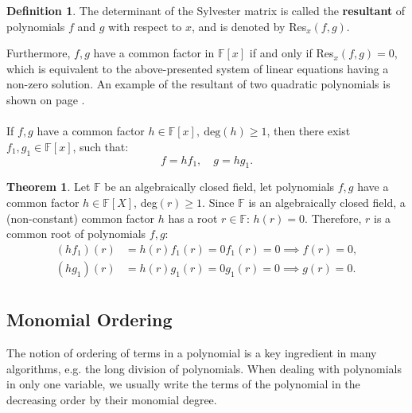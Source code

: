 \documentclass[thesis=M,english]{FITthesis}[2012/10/20]
\theoremstyle{remark}
\theoremstyle{definition}
\newtheorem{DF}{Definition}[section]
\newtheorem{theorem}{Theorem}[section]
\begin{document}
\begin{DF}
\noindent The determinant of the Sylvester matrix is called the \textbf{resultant} of polynomials $f$ and $g$ with respect to $x$, and is denoted by Res$_{x}(f,g)$.
\end{DF}
\noindent Furthermore, $f,g$ have a common factor in $\mathbb{F}[x]$ if and only if Res$_x(f,g) = 0$, which is equivalent to the above-presented system of linear equations having a non-zero solution. An example of the resultant of two quadratic polynomials is shown on page \pageref{resExample}. 
\\ \\
\noindent If $f,g$ have a common factor $h \in \mathbb{F}[x],\ \text{deg}(h) \geq 1$, then there exist ${f_1, g_1 \in \mathbb{F}[x]}$, such that:
$$
f = hf_1, \quad g = hg_1.
$$
\begin{theorem}
\noindent Let $\mathbb{F}$ be an algebraically closed field, let polynomials $f,g$ have a common factor $h \in \mathbb{F}[X]$, deg$(r) \geq 1$. Since $\mathbb{F}$ is an algebraically closed field, a (non-constant) common factor $h$ has a root ${r \in \mathbb{F}}$: ${h(r) = 0}$. Therefore, $r$ is a common root of polynomials $f,g$:
\begin{align*}
(hf_1)(r) &= h(r)f_1(r) = 0f_1(r) = 0 \implies f(r) = 0 ,\\
(hg_1)(r) &= h(r)g_1(r) = 0g_1(r) = 0 \implies g(r) = 0.\\
\end{align*}
\end{theorem}
\subsection{Monomial Ordering}
\noindent The notion of ordering of terms in a polynomial is a key ingredient in many algorithms, e.g. the long division of polynomials. When dealing with polynomials in only one variable, we usually write the terms of the polynomial in the decreasing order by their monomial degree. \\ \\
\end{document}
